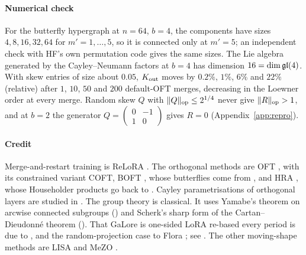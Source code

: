 \paragraph{Numerical check} For the butterfly hypergraph at $n=64$, $b=4$, the components have sizes $4,8,16,32,64$
for $m'=1,\dots,5$, so it is connected only at $m'=5$; an independent check with HF's own permutation code gives the
same sizes. The Lie algebra generated by the Cayley--Neumann factors at $b=4$ has dimension $16=\dim\mathfrak{gl}(4)$. With skew
entries of size about $0.05$, $K_{\rm out}$ moves by $0.2\%$, $1\%$, $6\%$ and $22\%$ (relative) after $1$, $10$, $50$
and $200$ default-OFT merges, decreasing in the Loewner order at every merge. Random skew $Q$ with
$\lVert Q\rVert_{\rm op}\le2^{1/4}$ never give $\lVert R\rVert_{\rm op}>1$, and at $b=2$ the generator
$Q=\left(\begin{smallmatrix}0&-1\\1&0\end{smallmatrix}\right)$ gives $R=0$ (Appendix~\ref{app:repro}).

\paragraph{Credit} Merge-and-restart training is ReLoRA \citep{lialin2023relora}. The orthogonal methods are OFT
\citep{qiu2023controlling}, with its constrained variant COFT, BOFT \citep{liu2023parameter}, whose butterflies come from
\citet{dao2019learning}, and HRA \citep{yuan2024bridging}, whose Householder products go back to
\citet{mhammedi2016efficient}. Cayley parametrisations of orthogonal layers are studied in
\citet{lezcanocasado2019cheap}. The group theory is classical. It uses Yamabe's theorem on arcwise connected subgroups
\citep{xyamabe1950arcwise} () and Scherk's sharp form of the Cartan--Dieudonné theorem
\citep{xscherk1950decomposition} (). That GaLore \citep{zhao2024galore} is one-sided LoRA re-based every
period is due to \citet{xtorrobahennigen2025duality}, and the random-projection case to Flora \citep{hao2024flora}; see
. The other moving-shape methods are LISA \citep{pan2024lisa} and MeZO
\citep{malladi2023fine}.

